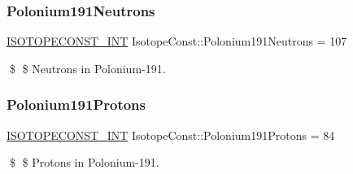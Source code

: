 \subsubsection{\texorpdfstring{Polonium191\+Neutrons}{Polonium191Neutrons}}
{\footnotesize\ttfamily \mbox{\hyperlink{group___isotope_const-_macros_ga5f18360b3e99483a35c32d789e62621c}{I\+S\+O\+T\+O\+P\+E\+C\+O\+N\+S\+T\+\_\+\+I\+NT}} Isotope\+Const\+::\+Polonium191\+Neutrons = 107}

\$ \$ Neutrons in Polonium-\/191. \mbox{\label{group___isotope_const-_polonium-_po191_ga83a3994599b6ec61432c63e856c72c85}} 
\subsubsection{\texorpdfstring{Polonium191\+Protons}{Polonium191Protons}}
{\footnotesize\ttfamily \mbox{\hyperlink{group___isotope_const-_macros_ga5f18360b3e99483a35c32d789e62621c}{I\+S\+O\+T\+O\+P\+E\+C\+O\+N\+S\+T\+\_\+\+I\+NT}} Isotope\+Const\+::\+Polonium191\+Protons = 84}

\$ \$ Protons in Polonium-\/191. 